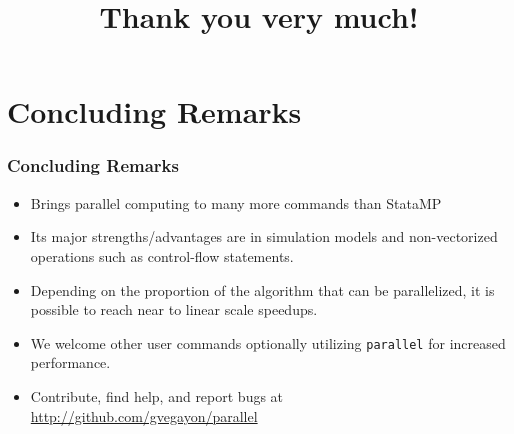 \documentclass[9pt,\ExtraDocOpts]{beamer}
\begin{document}
\section{Concluding Remarks}

\begin{frame}
\frametitle{Concluding Remarks}

\begin{itemize}
\item Brings parallel computing to many more commands than StataMP \pause{}
\item Its major strengths/advantages are in simulation models and non-vectorized operations such as control-flow statements.\pause{}
\item Depending on the proportion of the algorithm that can be parallelized, it is possible to reach near to linear scale speedups.\pause{}
\item We welcome other user commands optionally utilizing {\tt parallel} for increased performance. \pause{}
\item Contribute, find help, and report bugs at \url{http://github.com/gvegayon/parallel}

\end{itemize}

\end{frame}

\title{Thank you very much!}

\frame{\maketitle
}
\end{document}
